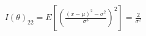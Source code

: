 \documentclass[preview]{standalone}
\begin{document}
\begin{align*}
I(\theta)_{22} = E\left[\left(\frac{(x-\mu)^2-\sigma^2}{\sigma^3}\right)^2\right] = \frac{2}{\sigma^2}
\end{align*}
\end{document}
